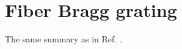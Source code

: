 \documentclass[aps,pra, onecolumn,superscriptaddress,nopacs,floatfix, showkeys, notitlepage]{revtex4-1}
\begin{document}





\newpage

\section{Fiber Bragg grating}
The same summary as in Ref. \cite{note_temp}.
\label{app:1dmodel}
\end{document}
